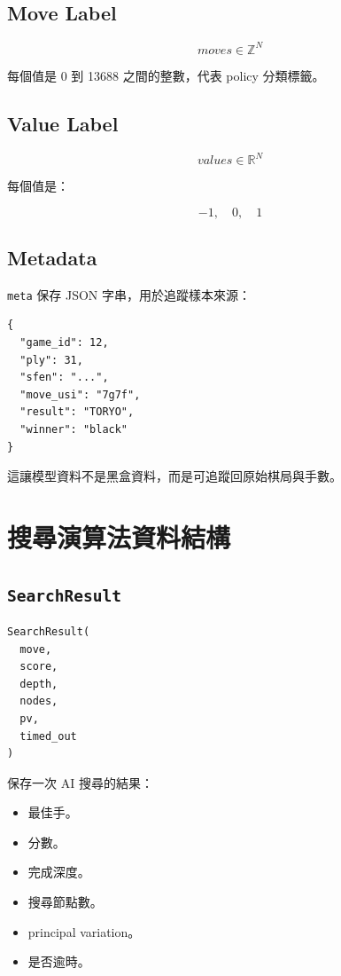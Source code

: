 \documentclass[12pt,a4paper,fontset=none]{ctexart}
\begin{document}
\subsection{Move Label}

\[
moves \in \mathbb{Z}^{N}
\]

每個值是 0 到 13688 之間的整數，代表 policy 分類標籤。

\subsection{Value Label}

\[
values \in \mathbb{R}^{N}
\]

每個值是：

\[
-1,\quad 0,\quad 1
\]

\subsection{Metadata}

\texttt{meta} 保存 JSON 字串，用於追蹤樣本來源：

\begin{lstlisting}[style=cmd]
{
  "game_id": 12,
  "ply": 31,
  "sfen": "...",
  "move_usi": "7g7f",
  "result": "TORYO",
  "winner": "black"
}
\end{lstlisting}

這讓模型資料不是黑盒資料，而是可追蹤回原始棋局與手數。

\section{搜尋演算法資料結構}

\subsection{\texttt{SearchResult}}

\begin{lstlisting}[style=cmd]
SearchResult(
  move,
  score,
  depth,
  nodes,
  pv,
  timed_out
)
\end{lstlisting}

保存一次 AI 搜尋的結果：

\begin{itemize}
  \item 最佳手。
  \item 分數。
  \item 完成深度。
  \item 搜尋節點數。
  \item principal variation。
  \item 是否逾時。
\end{itemize}
\end{document}
